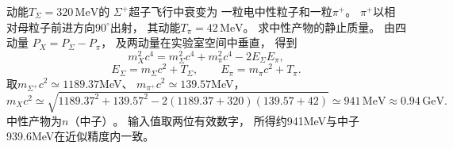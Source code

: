 动能$T_\Sigma=320\,\mathrm{MeV}$的
$\Sigma^+$超子飞行中衰变为
一粒电中性粒子和一粒$\pi^+$。
$\pi^+$以相对母粒子前进方向$90^\circ$出射，
其动能$T_\pi=42\,\mathrm{MeV}$。
求中性产物的静止质量。
\exsolution
由四动量
$P_X=P_\Sigma-P_\pi$，
及两动量在实验室空间中垂直，
得到
\[
 m_X^2c^4=
 m_\Sigma^2c^4+m_\pi^2c^4-2E_\Sigma E_\pi,
\]
\[
 E_\Sigma=m_\Sigma c^2+T_\Sigma,\qquad
 E_\pi=m_\pi c^2+T_\pi.
\]
取$m_{\Sigma^+}c^2\simeq1189.37$MeV、
$m_{\pi^+}c^2\simeq139.57$MeV，
\[
 \boxed{m_Xc^2\simeq
 \sqrt{1189.37^2+139.57^2-
 2(1189.37+320)(139.57+42)}
 \simeq941\,\mathrm{MeV}\approx0.94\,\mathrm{GeV}}.
\]
中性产物为$\boxed{n\text{（中子）}}$。
\excheck 输入值取两位有效数字，
所得约941MeV与中子939.6MeV在近似精度内一致。
